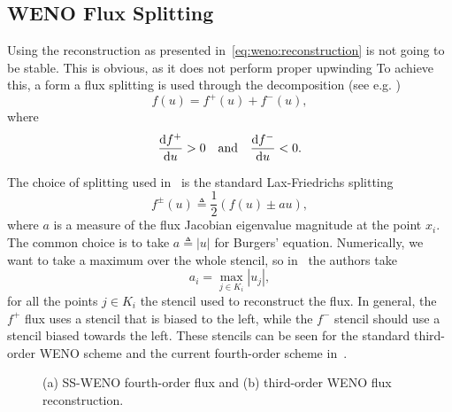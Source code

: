 \documentclass{scrartcl}
\begin{document}

\subsection{WENO Flux Splitting} %
\label{ssc:weno:flux}

Using the reconstruction as presented in~\eqref{eq:weno:reconstruction} is
not going to be stable. This is obvious, as it does not perform proper upwinding
To achieve this, a form a flux splitting is used through the decomposition
(see e.g. \cite{Fisher2012})
\[
f(u) = f^+(u) + f^-(u),
\]
where
\[
\dfrac{\mathrm{d} f^+}{\mathrm{d} u} > 0
\quad \text{and} \quad
\dfrac{\mathrm{d} f^-}{\mathrm{d} u} < 0.
\]

The choice of splitting used in~\cite{Fisher2012} is the standard Lax-Friedrichs
splitting
\[
f^\pm(u) \triangleq \frac{1}{2} (f(u) \pm a u),
\]
where $a$ is a measure of the flux Jacobian eigenvalue magnitude at the point
$x_i$. The common choice is to take $a \triangleq |u|$ for Burgers' equation.
Numerically, we want to take a maximum over the whole stencil, so
in~\cite{Fisher2012} the authors take
\[
a_i = \max_{j \in K_i} |u_j|,
\]
for all the points $j \in K_i$ the stencil used to reconstruct the flux. In
general, the $f^+$ flux uses a stencil that is biased to the left, while the
$f^-$ stencil should use a stencil biased towards the left. These stencils
can be seen for the standard third-order WENO scheme and the current fourth-order
scheme in~.

\begin{figure}[H]
\centering
{}
\caption{
    (a) SS-WENO fourth-order flux and
    (b) third-order WENO flux reconstruction.}
\label{fig:weno:fluxes}
\end{figure}
\end{document}

